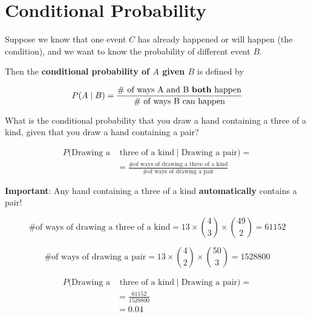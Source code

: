 \section{Conditional Probability}

%
\begin{frame}

Suppose we know that one event $C$ has already happened or will happen (the
condition), and we want to know the probability of different event $B$.

\hfill

Then the \textbf{conditional probability of $A$ given $B$} is defined by

$$ P(A \mid B) = \frac{\text{\# of ways A and B \textbf{both} happen}}{\text{\#
of ways B can happen}} $$

\end{frame}
%

%
\begin{frame}

What is the conditional probability that you draw a hand containing a three of a
kind, given that you draw a hand containing a pair?

\begin{align*}
P(\text{Drawing a} & \text{ three of a kind} \mid \text{Drawing a pair}) = \\
&= \frac{\text{\# of ways of drawing a three of a kind}}{\text{\# of ways of
drawing a pair}}
\end{align*}

\textbf{Important}: Any hand containing a three of a kind \textbf{automatically}
contains a pair!

\end{frame}
%

%
\begin{frame}

$$ \text{\# of ways of drawing a three of a kind} = 13 \times {{4}\choose{3}}
\times {{49}\choose{2}} = 61152 $$

$$ \text{\# of ways of drawing a pair} = 13 \times {{4}\choose{2}}
\times {{50}\choose{3}} = 1528800 $$

\end{frame}
%

%
\begin{frame}

\begin{align*}
P(\text{Drawing a} & \text{ three of a kind} \mid \text{Drawing a pair}) = \\
&= \frac{61152}{1528800} \\
&= 0.04
\end{align*}

\end{frame}
%

